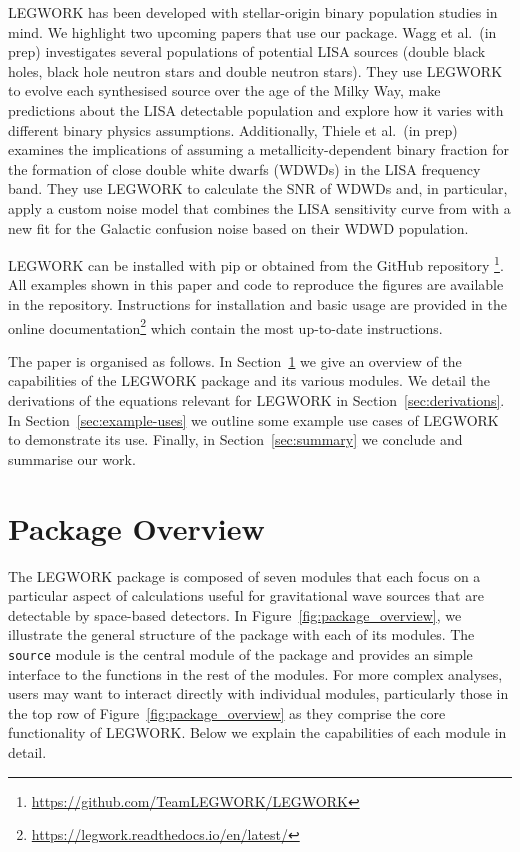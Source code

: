 \documentclass[twocolumn]{aastex631}
\newcommand{\lw}{LEGWORK}
\begin{document}
\lw{} has been developed with stellar-origin binary population studies in mind. We highlight two upcoming papers that use our package. Wagg et al.\ (in prep) investigates several populations of potential LISA sources (double black holes, black hole neutron stars and double neutron stars). They use \lw{} to evolve each synthesised source over the age of the Milky Way, make predictions about the LISA detectable population and explore how it varies with different binary physics assumptions. Additionally, Thiele et al.\ (in prep) examines the implications of assuming a metallicity-dependent binary fraction for the formation of close double white dwarfs (WDWDs) in the LISA frequency band. They use \lw{} to calculate the SNR of WDWDs and, in particular, apply a custom noise model that combines the LISA sensitivity curve from \citet{Robson+2019} with a new fit for the Galactic confusion noise based on their WDWD population.

\lw{} can be installed with pip or obtained from the GitHub repository \href{https://github.com/TeamLEGWORK/LEGWORK}{\faGithub}\footnote{\url{https://github.com/TeamLEGWORK/LEGWORK}}. All examples shown in this paper and code to reproduce the figures are available in the repository. Instructions for installation and basic usage are provided in the online documentation\footnote{\url{https://legwork.readthedocs.io/en/latest/}} which contain the most up-to-date instructions.

The paper is organised as follows. In Section~\ref{sec:LEGWORK-overview} we give an overview of the capabilities of the \lw{} package and its various modules. We detail the derivations of the equations relevant for \lw{} in Section~\ref{sec:derivations}. In Section~\ref{sec:example-uses} we outline some example use cases of \lw{} to demonstrate its use. Finally, in Section~\ref{sec:summary} we conclude and summarise our work.

\section{Package Overview}\label{sec:LEGWORK-overview}

The \lw{} package is composed of seven modules that each focus on a particular aspect of calculations useful for gravitational wave sources that are detectable by space-based detectors. In Figure~\ref{fig:package_overview}, we illustrate the general structure of the package with each of its modules. The \texttt{source} module is the central module of the package and provides an simple interface to the functions in the rest of the modules. For more complex analyses, users may want to interact directly with individual modules, particularly those in the top row of Figure~\ref{fig:package_overview} as they comprise the core functionality of \lw{}. Below we explain the capabilities of each module in detail.
\end{document}
